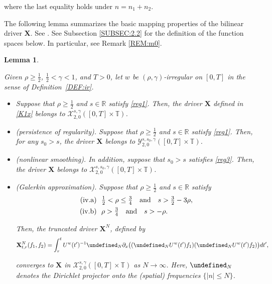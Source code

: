 \documentclass[letterpaper, 11pt,  reqno]{amsart}
\newtheorem{lemma}[theorem]{Lemma}
\newcommand{\1}{\hspace{0.5mm}\textup{I}\hspace{0.5mm}}
\newcommand{\noi}{\noindent}
\newcommand{\R}{\mathbb{R}}
\newcommand{\T}{\mathbb{T}}
\let\P= \undefined
\newcommand{\P}{\mathbf{P}}
\newcommand{\g}{\gamma}
\newcommand{\cX}{\mathcal{X}}
\newcommand{\cY}{\mathcal{Y}}
\newcommand{\uw}{U^w}
\newcommand{\XX}{\mathbf{X}}
\numberwithin{equation}{section}
\numberwithin{theorem}{section}
\begin{document}
\noi
where the last equality holds
 under $n = n_1+ n_2$.
 
 
 



The following lemma summarizes the 
basic mapping properties
of the bilinear driver $\XX$.
See 
\cite[Proposition 4.1]{CGLLO1}.
See Subsection \ref{SUBSEC:2.2}
for the definition of the function spaces below.
In particular, see Remark \ref{REM:m0}.

\begin{lemma}
\label{LEM:kdv1}


Given $\rho \ge\frac 12$, $\frac 12 < \g < 1$, and $T> 0$, 
let  $w$ be $(\rho,\g)$-irregular on $[0, T]$ in the sense of Definition~\ref{DEF:ir}.

\smallskip


\begin{itemize}
\item[(i)]
Suppose that $\rho \ge \frac 12$ and $s \in \R$
satisfy 
\eqref{reg1}.
Then, 
the driver $\XX$ defined in \eqref{K1x}
belongs to $ \cX^{s, \g}_{2, 0}([0, T]\times \T)$.


\smallskip
\item[(ii)] \textup{(persistence of regularity).}
Suppose that $\rho \ge \frac 12$ and $s \in \R$
satisfy 
\eqref{reg1}.
Then, 
for any $s_0 > s$, 
the driver $\XX$ 
belongs to 
$\cY^{s, s_0, \g}_{2, 0}([0, T]\times \T)$.





\smallskip
\item[(iii)]
\textup{(nonlinear smoothing).}
In addition, suppose that $s_0 > s$ satisfies
\eqref{reg3}.
Then, 
the driver $\XX$ 
belongs to 
$\cX^{s, s_0, \g}_{2, 0}([0, T]\times \T)$.



\smallskip
\item[(iv)]
\textup{(Galerkin approximation).}
Suppose that $\rho \ge \frac 12$ and $s \in \R$
satisfy
\begin{align}
\begin{split}
\textup{(iv.a)} &\ \  \tfrac 12 < \rho \le  \tfrac 34 \quad \text{and} \quad 
s > \tfrac 32 - 3 \rho, \\
\textup{(iv.b)} &\ \  \rho > \tfrac 34\quad  \text{and} \quad  s > - \rho.
\end{split}
\label{reg3a}
\end{align}


 
\noi
Then, 
the truncated driver $\XX^N$, defined by 
\begin{align*}
\XX_{t,r}^N(f_1,f_2)=\int_r^t \uw(t')^{-1} \P_N \partial_x\big(
( \P_N \uw(t')  f_1 )(\P_N \uw(t') f_2 )\big) dt', 
\end{align*}

\noi
 converges
to  $\XX$ 
in  $ \cX^{s, \g}_{2, 0}([0, T]\times \T)$ as $N \to \infty$.
Here, 
 $\P_N$
 denotes  the Dirichlet projector onto the (spatial) frequencies 
$\{|n| \leq N\}$.



\end{itemize}




 \end{lemma}
\end{document}
